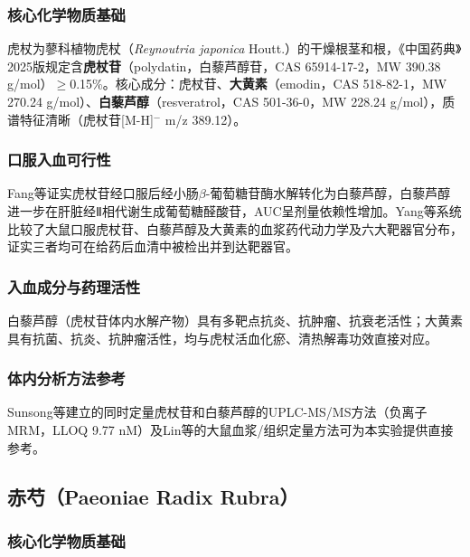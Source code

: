 \documentclass[12pt,a4paper,UTF8,openany]{ctexbook}
\newcommand{\compoundname}[1]{\textbf{#1}}
\newcommand{\herbname}[1]{\textit{#1}}
\begin{document}
\subsubsection{核心化学物质基础}

虎杖为蓼科植物虎杖（\herbname{Reynoutria japonica} Houtt.）的干燥根茎和根，《中国药典》2025版规定含\compoundname{虎杖苷}（polydatin，白藜芦醇苷，CAS 65914-17-2，MW 390.38 g/mol）$\geq$0.15\%。核心成分：虎杖苷、\compoundname{大黄素}（emodin，CAS 518-82-1，MW 270.24 g/mol）、\compoundname{白藜芦醇}（resveratrol，CAS 501-36-0，MW 228.24 g/mol），质谱特征清晰（虎杖苷[M-H]$^-$ m/z 389.12）\cite{ZhangY2023}。

\subsubsection{口服入血可行性}

Fang等\cite{Fang2009}证实虎杖苷经口服后经小肠$\beta$-葡萄糖苷酶水解转化为白藜芦醇，白藜芦醇进一步在肝脏经Ⅱ相代谢生成葡萄糖醛酸苷，AUC呈剂量依赖性增加。Yang等\cite{Yang2024}系统比较了大鼠口服虎杖苷、白藜芦醇及大黄素的血浆药代动力学及六大靶器官分布，证实三者均可在给药后血清中被检出并到达靶器官。

\subsubsection{入血成分与药理活性}

白藜芦醇（虎杖苷体内水解产物）具有多靶点抗炎、抗肿瘤、抗衰老活性；大黄素具有抗菌、抗炎、抗肿瘤活性，均与虎杖活血化瘀、清热解毒功效直接对应\cite{ZhangY2023}。

\subsubsection{体内分析方法参考}

Sunsong等\cite{Sunsong2021}建立的同时定量虎杖苷和白藜芦醇的UPLC-MS/MS方法（负离子MRM，LLOQ 9.77 nM）及Lin等\cite{Lin2012}的大鼠血浆/组织定量方法可为本实验提供直接参考。

\subsection{赤芍（Paeoniae Radix Rubra）}

\subsubsection{核心化学物质基础}
\end{document}
